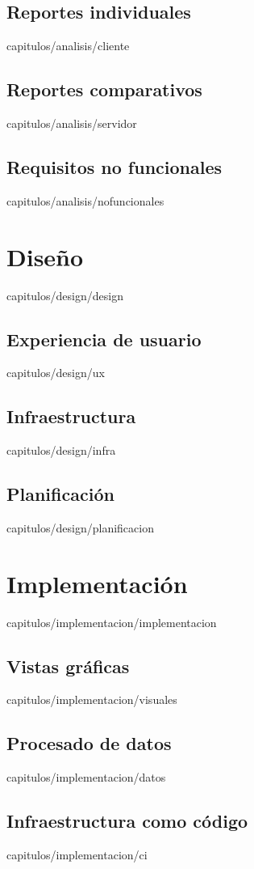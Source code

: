 \documentclass[epsbased,lof,copyright,final,printable,covers,extendedindex,firstnumbered,tfg,gnuplot]{thesis}
\begin{document}
  \section{Reportes individuales\label{SEC:CLIENTE}}{capitulos/analisis/cliente}
  \section{Reportes comparativos\label{SEC:SERVIDOR}}{capitulos/analisis/servidor}
  \section{Requisitos no funcionales\label{SEC:NOFUNCIONALES}}{capitulos/analisis/nofuncionales}

\chapter{Diseño\label{CAP:DESIGN}}{capitulos/design/design}
  \section{Experiencia de usuario\label{SEC:UX}}{capitulos/design/ux}
  \section{Infraestructura\label{SEC:INFRA}}{capitulos/design/infra}
  \section{Planificación\label{SEC:PLANIFICACION}}{capitulos/design/planificacion}

\chapter{Implementación\label{CAP:IMPLEMENTACION}}{capitulos/implementacion/implementacion}
  \section{Vistas gráficas\label{SEC:VISUALES}}{capitulos/implementacion/visuales}
  \section{Procesado de datos\label{SEC:DATOS}}{capitulos/implementacion/datos}
  \section{Infraestructura como código\label{SEC:CI}}{capitulos/implementacion/ci}
\end{document}
